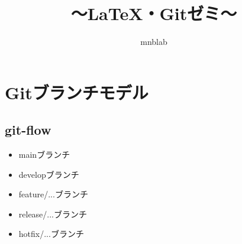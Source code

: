 \documentclass[%
uplatex,%
dvipdfmx,%
a4paper,%
]{jsarticle}
\begin{document}
\title{～\LaTeX ・Gitゼミ～}
\author{mnblab}
\maketitle

\section{Gitブランチモデル}
\subsection{git-flow}
\begin{itemize}
  \item mainブランチ
  \item developブランチ
  \item feature/...ブランチ
  \item release/...ブランチ
  \item hotfix/...ブランチ
\end{itemize}
\end{document}
